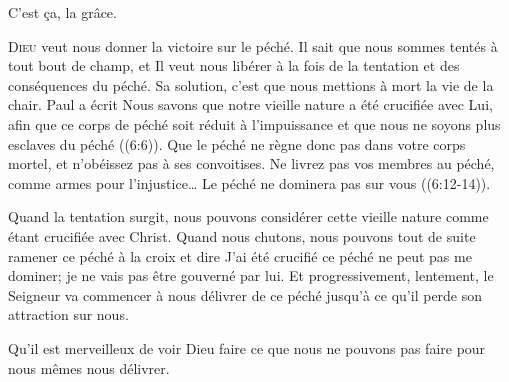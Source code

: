 C'est \c{c}a,  la grâce.

\dvrule







\lettrine{D}{ieu} veut nous donner la victoire sur le péché.
 Il sait que nous sommes tentés à tout bout de champ,
 et Il veut nous libérer à la fois de la tentation et des conséquences
 du péché. Sa solution, c'est que nous mettions à mort la vie de la chair.
 Paul a écrit\frcolon{} 
 \Og Nous savons que notre vieille nature a été crucifiée avec Lui,
 afin que ce corps de péché soit réduit à l'impuissance
 et que nous ne soyons plus esclaves du péché \Fg{} ((6:6)).
 \Og Que le péché ne règne donc pas dans votre corps mortel,
 et n'obéissez pas à ses convoitises. Ne livrez pas vos membres au péché,
 comme armes pour l'injustice\dots{}
 Le péché ne dominera pas sur vous \Fg{} ((6:12-14)).


Quand la tentation surgit, nous pouvons considérer cette vieille nature
 comme étant crucifiée avec Christ. Quand nous chutons, nous pouvons
 tout de suite ramener ce péché à la croix et dire\frcolon{} 
 \Og J'ai été crucifié \ocadr ce péché ne peut pas me dominer;
 je ne vais pas être gouverné par lui. \Fg{}
 Et progressivement, lentement, le Seigneur va commencer à nous délivrer
 de ce péché jusqu'à ce qu'il perde son attraction sur nous.

Qu'il est merveilleux de voir Dieu faire ce que nous ne pouvons pas faire
 pour nous mêmes \ocadr nous délivrer.

\dvrule

